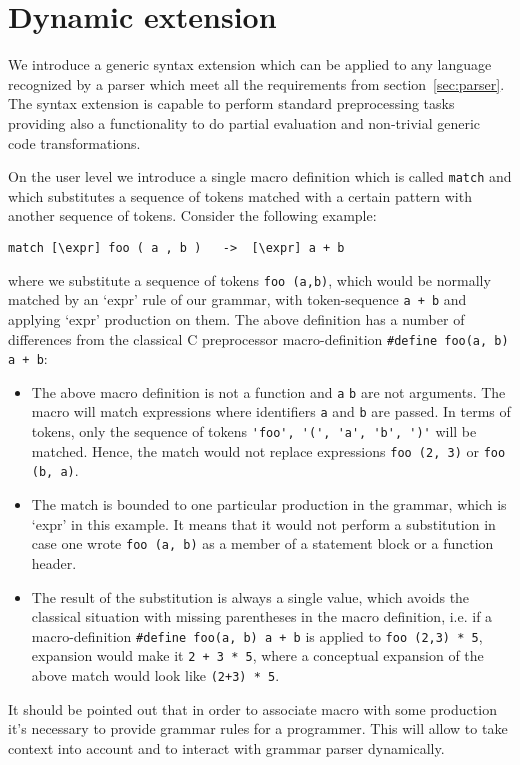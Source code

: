 \section{Dynamic extension}

We introduce a generic syntax extension which can be applied to any
language recognized by a parser which meet all the requirements from
section~\ref{sec:parser}.  The syntax extension is capable to perform
standard preprocessing tasks providing also a functionality to do
partial evaluation and non-trivial generic code transformations.

On the user level we introduce a single macro definition which is called 
\verb|match| and which substitutes a sequence of tokens matched
with a certain pattern with another sequence of tokens.  
Consider the following example:
\begin{verbatim}
match [\expr] foo ( a , b )   ->  [\expr] a + b
\end{verbatim}
where we substitute a sequence of tokens \verb|foo (a,b)|, which would 
be normally matched by an `expr' rule of our grammar, with
token-sequence \verb|a + b| and applying `expr' production on them.
The above definition has a number of differences from the 
classical C preprocessor macro-definition \verb|#define foo(a, b) a + b|:
\begin{itemize}
  \item The above macro definition is not a function and \verb|a|
  \verb|b| are not arguments. The macro will match expressions where identifiers \verb|a| and
  \verb|b| are passed. In terms of tokens, only the sequence of tokens
  \verb|'foo', '(', 'a', 'b', ')'| will be matched.
  Hence, the match would not replace
  expressions \verb|foo (2, 3)| or \verb|foo (b, a)|. 
  \item The match is bounded to one particular production in the grammar, which
  is `expr' in this example. It means that it 
  would not perform a substitution in case one wrote \verb|foo (a, b)|
  as a member of a statement block or a function header.
  \item The result of the substitution is always a single value, which avoids 
  the classical situation with missing parentheses in the macro definition, 
  i.e. if a macro-definition \verb|#define foo(a, b) a + b| is applied to 
  \verb|foo (2,3) * 5|, expansion would make it \verb|2 + 3 * 5|, where
  a conceptual expansion of the above match would look like \verb|(2+3) * 5|.
\end{itemize}
It should be pointed out that in order to associate macro with some production
it's necessary to provide grammar rules for a programmer. This will allow to
take context into account and to interact with grammar parser dynamically.
